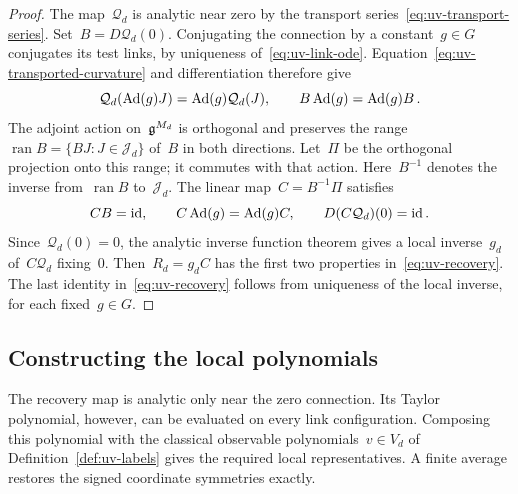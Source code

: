 \begin{proof}
The map~$\mathcal Q_d$ is analytic near zero by the transport series~\eqref{eq:uv-transport-series}.
Set~$B=D\mathcal Q_d(0)$.
Conjugating the connection by a constant~$g\in G$ conjugates its test links, by uniqueness of~\eqref{eq:uv-link-ode}.
Equation~\eqref{eq:uv-transported-curvature} and differentiation therefore give
\begin{equation*}
 \mathcal Q_d(\operatorname{Ad}(g)J)=\operatorname{Ad}(g)\mathcal Q_d(J),\qquad
 B\operatorname{Ad}(g)=\operatorname{Ad}(g)B\,.
\end{equation*}
The adjoint action on~$\mathfrak g^{M_d}$ is orthogonal and preserves the range~$\operatorname{ran}B=\{BJ:J\in\mathcal J_d\}$ of~$B$ in both directions.
Let~$\Pi$ be the orthogonal projection onto this range; it commutes with that action.
Here~$B^{-1}$ denotes the inverse from~$\operatorname{ran}B$ to~$\mathcal J_d$.
The linear map~$C=B^{-1}\Pi$ satisfies
\begin{equation*}
 CB=\mathrm{id},\qquad C\operatorname{Ad}(g)=\operatorname{Ad}(g)C,\qquad
 D(C\mathcal Q_d)(0)=\mathrm{id}\,.
\end{equation*}
Since~$\mathcal Q_d(0)=0$, the analytic inverse function theorem gives a local inverse~$g_d$ of~$C\mathcal Q_d$ fixing~$0$.
Then~$R_d=g_dC$ has the first two properties in~\eqref{eq:uv-recovery}.
The last identity in~\eqref{eq:uv-recovery} follows from uniqueness of the local inverse, for each fixed~$g\in G$.
\end{proof}

\subsection{Constructing the local polynomials}\label{subsec:uv-section-build}

The recovery map is analytic only near the zero connection.
Its Taylor polynomial, however, can be evaluated on every link configuration.
Composing this polynomial with the classical observable polynomials~$v\in V_d$ of Definition~\ref{def:uv-labels} gives the required local representatives.
A finite average restores the signed coordinate symmetries exactly.

